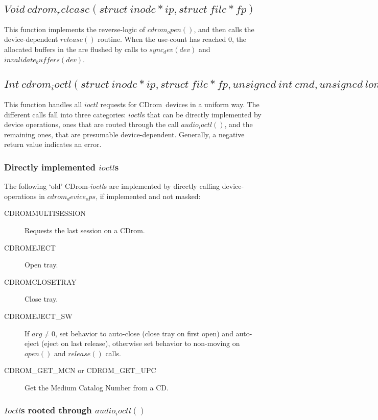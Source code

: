 \documentclass{article}
\def\cdrom{{\sc CDrom}}
\begin{document}
\subsection{$Void\ cdrom_release(struct\ inode *ip, struct\ file
*fp)$}

This function implements the reverse-logic of $cdrom_open()$, and then
calls the device-dependent $release()$ routine.  When the use-count
has reached 0, the allocated buffers in the are flushed by calls to
$sync_dev(dev)$ and $invalidate_buffers(dev)$.


\subsection{$Int\ cdrom_ioctl(struct\ inode *ip, struct\ file *fp,
                       unsigned\ int\ cmd, unsigned\ long\ arg)$}
\label{cdrom-ioctl}

This function handles all $ioctl$ requests for \cdrom\ devices in a
uniform way. The different calls fall into three categories: $ioctl$s
that can be directly implemented by device operations, ones that are
routed through the call $audio_ioctl()$, and the remaining ones, that
are presumable device-dependent. Generally, a negative return value
indicates an error. 

\subsubsection{Directly implemented $ioctl$s}
\label{ioctl-direct}

The following `old' \cdrom-$ioctl$s are implemented by directly
calling device-operations in $cdrom_device_ops$, if implemented and
not masked:
\begin{description}
\item[CDROMMULTISESSION] Requests the last session on a \cdrom.
\item[CDROMEJECT] Open tray. 
\item[CDROMCLOSETRAY] Close tray.
\item[CDROMEJECT_SW] If $arg\not=0$, set behavior to auto-close (close
tray on first open) and auto-eject (eject on last release), otherwise
set behavior to non-moving on $open()$ and $release()$ calls.
\item[CDROM_GET_MCN or CDROM_GET_UPC] Get the Medium Catalog Number from a CD.
\end{description}

\subsubsection{$Ioctl$s rooted through $audio_ioctl()$}
\label{ioctl-audio}
\end{document}
